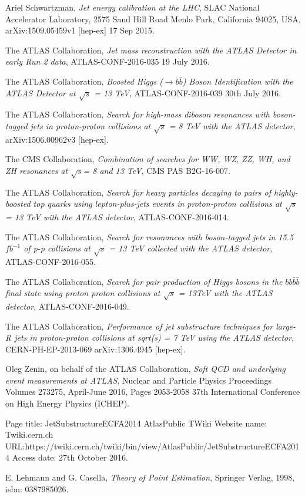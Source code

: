 \documentclass[UKenglish,texlive=2013]{\ATLASLATEXPATH atlasdoc}
\newcommand{\cme}{\sqrt{s}}
\begin{document}
\begin{thebibliography}{9}
Ariel Schwartzman,
\emph{Jet energy calibration at the LHC},
SLAC National Accelerator Laboratory, 2575 Sand Hill Road
Menlo Park, California 94025, USA,
arXiv:1509.05459v1 [hep-ex] 17 Sep 2015.

The ATLAS Collaboration,
\emph{Jet mass reconstruction with the ATLAS Detector in early Run 2 data},
ATLAS-CONF-2016-035
19 July 2016.

The ATLAS Collaboration,
\emph{Boosted Higgs ($\to b\bar{b}$) Boson Identification with the ATLAS
Detector at $\cme$ = 13 TeV},
ATLAS-CONF-2016-039
30th July 2016.

The ATLAS Collaboration,
\emph{Search for high-mass diboson resonances with boson-tagged jets in proton-proton collisions at $\cme$ = 8 TeV with the ATLAS detector},
arXiv:1506.00962v3 [hep-ex].

The CMS Collaboration,
\emph{Combination of searches for WW, WZ, ZZ, WH, and ZH
resonances at $\cme$= 8 and 13 TeV},
CMS PAS B2G-16-007.

The ATLAS Collaboration,
\emph{Search for heavy particles decaying to pairs of highly-boosted top
quarks using lepton-plus-jets events in proton-proton collisions at
$\cme$ = 13 TeV with the ATLAS detector},
ATLAS-CONF-2016-014.

The ATLAS Collaboration,
\emph{Search for resonances with boson-tagged jets in 15.5 $fb^{-1}$ of p-p
collisions at $\cme$ = 13 TeV collected with the ATLAS detector},
ATLAS-CONF-2016-055.

The ATLAS Collaboration,
\emph{Search for pair production of Higgs bosons in the $bb\bar{b}\bar{b}$ final state
using proton proton collisions at $\cme$ = 13TeV with the ATLAS detector},
ATLAS-CONF-2016-049.

The ATLAS Collaboration,
\emph{Performance of jet substructure techniques for large-R jets in proton-proton collisions at sqrt(s) = 7 TeV using the ATLAS detector},
CERN-PH-EP-2013-069
arXiv:1306.4945 [hep-ex].

Oleg Zenin, on behalf of the ATLAS Collaboration,
\emph{Soft QCD and underlying event measurements at ATLAS},
Nuclear and Particle Physics Proceedings
Volumes 273275, April-June 2016, Pages 2053-2058
37th International Conference on High Energy Physics (ICHEP).

Page title: JetSubstructureECFA2014 AtlasPublic TWiki
Website name: Twiki.cern.ch
URL:https://twiki.cern.ch/twiki/bin/view/AtlasPublic/JetSubstructureECFA2014
Access date: 27th October 2016.

E. Lehmann and G. Casella,
\emph{Theory of Point Estimation},
Springer Verlag, 1998,
isbn: 0387985026.

\end{thebibliography}
\printbibliography
%
%
\end{document}
